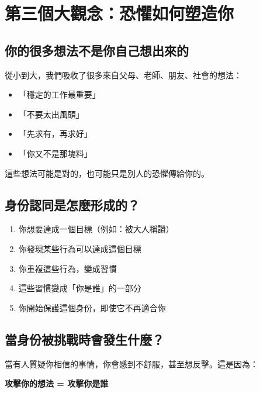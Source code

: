 \documentclass[12pt,a4paper]{article}
\begin{document}
\section{第三個大觀念：恐懼如何塑造你}

\subsection{你的很多想法不是你自己想出來的}

從小到大，我們吸收了很多來自父母、老師、朋友、社會的想法：

\begin{itemize}
    \item 「穩定的工作最重要」
    \item 「不要太出風頭」
    \item 「先求有，再求好」
    \item 「你又不是那塊料」
\end{itemize}

這些想法可能是對的，也可能只是別人的恐懼傳給你的。

\subsection{身份認同是怎麼形成的？}

\begin{enumerate}
    \item 你想要達成一個目標（例如：被大人稱讚）
    \item 你發現某些行為可以達成這個目標
    \item 你重複這些行為，變成習慣
    \item 這些習慣變成「你是誰」的一部分
    \item 你開始保護這個身份，即使它不再適合你
\end{enumerate}


\subsection{當身份被挑戰時會發生什麼？}

當有人質疑你相信的事情，你會感到不舒服，甚至想反擊。這是因為：

\textbf{攻擊你的想法 = 攻擊你是誰}
\end{document}
